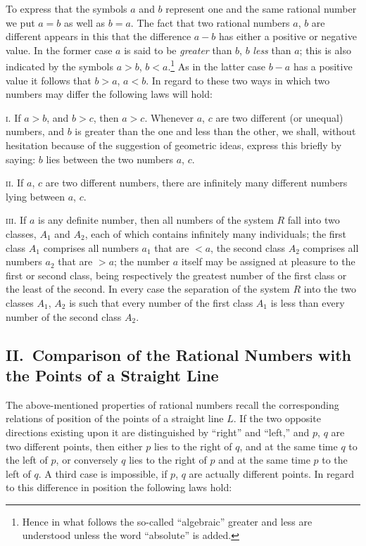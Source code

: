 \documentclass[twoside,openright]{article}
\begin{document}
To express that the symbols $a$ and $b$ represent one and the same
rational number we put $a = b$ as well as $b = a$. The fact that two
rational numbers $a$, $b$ are different appears in this that the
difference $a - b$ has either a positive or negative value. In the
former case $a$ is said to be \textit{greater} than $b$, $b$
\textit{less} than $a$; this is also indicated by the symbols $a > b$,
$b < a$.\footnote{Hence in what follows the so-called ``algebraic''
  greater and less are understood unless the word ``absolute'' is
  added.} As in the latter case $b - a$ has a positive value it
follows that $b > a$, $a < b$. In regard to these two ways in which
two numbers may differ the following laws will hold:

\textsc{i.} If $a > b$, and $b > c$, then $a > c$. Whenever $a$, $c$
are two different (or unequal) numbers, and $b$ is greater than the
one and less than the other, we shall, without hesitation because of
the suggestion of geometric ideas, express this briefly by saying: $b$
lies between the two numbers $a$, $c$.

\textsc{ii.} If $a$, $c$ are two different numbers, there are
infinitely many different numbers lying between $a$, $c$.

\textsc{iii.} If $a$ is any definite number, then all numbers of the
system $R$ fall into two classes, $A_1$ and $A_2$, each of which
contains infinitely many individuals; the first class $A_1$ comprises
all numbers $a_1$ that are $< a$, the second class $A_2$ comprises all
numbers $a_2$ that are $> a$; the number $a$ itself may be assigned at
pleasure to the first or second class, being respectively the greatest
number of the first class or the least of the second. In every case
the separation of the system $R$ into the two classes $A_1$, $A_2$ is
such that every number of the first class $A_1$ is less than every
number of the second class $A_2$.

\subsection*{II.\ Comparison of the Rational Numbers with the Points
  of a Straight Line}

The above-mentioned properties of rational numbers recall the
corresponding relations of position of the points of a straight line
$L$. If the two opposite directions existing upon it are distinguished
by ``right'' and ``left,'' and $p$, $q$ are two different points, then
either $p$ lies to the right of $q$, and at the same time $q$ to the
left of $p$, or conversely $q$ lies to the right of $p$ and at the
same time $p$ to the left of $q$. A third case is impossible, if $p$,
$q$ are actually different points.  In regard to this difference in
position the following laws hold:
\end{document}
